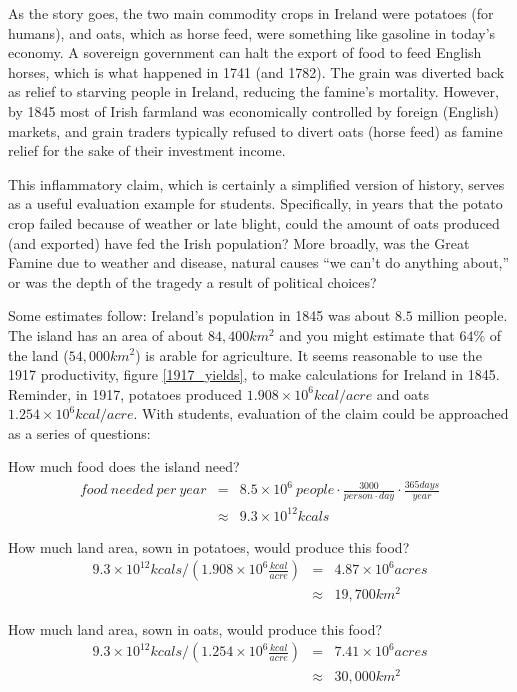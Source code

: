 \documentclass[prb,preprint]{revtex4-2}
\newcommand{\bea}{\begin{eqnarray}}
\newcommand{\eea}{\end{eqnarray}}
\begin{document}
As the story goes, the two main commodity crops in Ireland were potatoes (for humans), and oats, which as horse feed, were something like gasoline in today's economy.  A sovereign government can halt the export of food to feed English horses, which is what happened in 1741 (and 1782). The grain was diverted back as relief to starving people in Ireland, reducing the famine's mortality. However, by 1845 most of Irish farmland was economically controlled by foreign (English) markets, and grain traders typically refused to divert oats (horse feed) as famine relief for the sake of their investment income.

This inflammatory claim, which is certainly a simplified version of history, serves as a useful evaluation example for students. Specifically, in years that the potato crop failed because of weather or late blight, could the amount of oats produced (and exported) have fed the Irish population?  More broadly, was the Great Famine due to weather and disease, natural causes ``we can't do anything about,''  or was the depth of the tragedy a result of political choices?

Some estimates follow:  Ireland's population in 1845 was about $8.5$ million people.  The island has an area of about $84,400km^2$\cite{IRE_area} and you might estimate that $64\%$ of the land ($54,000km^2$) is arable for agriculture. \cite{arable_percentage}  
It seems reasonable to use the 1917 productivity,  figure \ref{1917_yields},  to make calculations for Ireland in 1845.  Reminder, in 1917, potatoes produced $1.908\times10^6 kcal/acre$ and oats $1.254\times10^6kcal/acre$.
With students, evaluation of the claim could be approached as a series of questions:

How much food does the island need?
\bea
food~needed~per~year &=& 8.5\times10^6~people
	\cdot \frac{3000}{person\cdot day }
	\cdot \frac{365days}{year} \nonumber \\
&\approx& 9.3\times 10^{12} kcals \nonumber
\eea       

How much land area, sown in potatoes, would produce this food?
\bea
9.3\times10^{12}kcals /\left(1.908\times 10^6\frac{kcal}{acre}\right) &=& 4.87\times10^6 acres \nonumber\\
 &\approx& 19,700 km^2 \nonumber
\eea

How much land area, sown in oats, would produce this food?
\bea
9.3\times10^{12}kcals /\left(1.254\times10^6\frac{kcal}{acre}\right) &=& 7.41 \times10^6 acres \nonumber \\
 &\approx& 30,000 km^2 \nonumber
\eea
\end{document}
